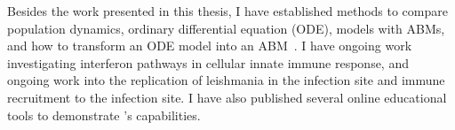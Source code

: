 Besides the work presented in this thesis, I have established methods to compare population dynamics, ordinary differential equation (ODE), models with ABMs, and how to transform an ODE model into an ABM~\cite{sego_generation_2021}. I have ongoing work investigating interferon pathways in cellular innate immune response, and ongoing work into the replication of leishmania in the infection site and immune recruitment to the infection site. I have also published several online educational tools to demonstrate \ccd's capabilities.


 

